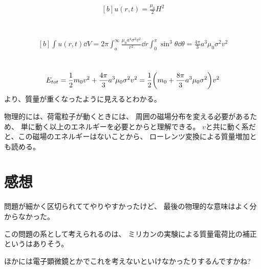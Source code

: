 \documentclass[../ap_2014.tex]{subfiles}
\begin{document}
\section{}
\begin{equation}\begin{aligned}[b]
    u(r,t)=\frac{\mu_0}{2}H^2
\end{aligned}\end{equation}

\section{}
\begin{equation}\begin{aligned}[b]
    \int u(r,t)\dd{V}
    = 2\pi\int_{a}^{\infty}\frac{\mu_0 a^4\sigma^2 v^2}{r^2}\dd{r}\int_{0}^{\pi}\sin^3\theta \dd{\theta}
    = \frac{4\pi}{3}a^3 \mu_0 \sigma^2 v^2
\end{aligned}\end{equation}

\section{}
\begin{equation}\begin{aligned}[b]
    E_{tot}=\frac{1}{2}m_0v^2+\frac{4\pi}{3}a^3 \mu_0\sigma^2 v^2
    =\frac{1}{2}\qty(m_0+\frac{8\pi}{3}a^3 \mu_0 \sigma^2 )v^2
\end{aligned}\end{equation}
より、質量が重くなったように見えるとわかる。

物理的には、荷電粒子が動くときには、
周囲の磁場分布を変える必要があるため、
単に動く以上のエネルギーを必要とからと理解できる。
\(v\)と共に動く系だと、この磁場のエネルギーはないことから、
ローレンツ変換による質量増加とも読める。


\section*{感想}
問題が細かく区切られててやりやすかったけど、
最後の物理的な意味はよく分からなかった。

この問題の系として考えられるのは、
ミリカンの実験による質量電荷比の補正というはありそう。

ほかには電子顕微鏡とかでこれを考えないといけなかったりするんですかね?
\end{document}
